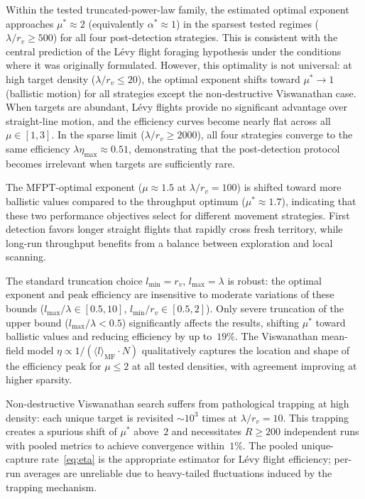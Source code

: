Within the tested truncated-power-law family, the estimated optimal exponent approaches $\mu^* \approx 2$ (equivalently $\alpha^* \approx 1$) in the sparsest tested regimes ($\lambda/r_v \geq 500$) for all four post-detection strategies. This is consistent with the central prediction of the L\'evy flight foraging hypothesis under the conditions where it was originally formulated. However, this optimality is not universal: at high target density ($\lambda/r_v \leq 20$), the optimal exponent shifts toward $\mu^* \to 1$ (ballistic motion) for all strategies except the non-destructive Viswanathan case. When targets are abundant, L\'evy flights provide no significant advantage over straight-line motion, and the efficiency curves become nearly flat across all $\mu \in [1,3]$. In the sparse limit ($\lambda/r_v \geq 2000$), all four strategies converge to the same efficiency $\lambda\eta_{\max} \approx 0.51$, demonstrating that the post-detection protocol becomes irrelevant when targets are sufficiently rare.

The MFPT-optimal exponent ($\mu \approx 1.5$ at $\lambda/r_v = 100$) is shifted toward more ballistic values compared to the throughput optimum ($\mu^* \approx 1.7$), indicating that these two performance objectives select for different movement strategies. First detection favors longer straight flights that rapidly cross fresh territory, while long-run throughput benefits from a balance between exploration and local scanning.

The standard truncation choice $l_{\min} = r_v$, $l_{\max} = \lambda$ is robust: the optimal exponent and peak efficiency are insensitive to moderate variations of these bounds ($l_{\max}/\lambda \in [0.5, 10]$, $l_{\min}/r_v \in [0.5, 2]$). Only severe truncation of the upper bound ($l_{\max}/\lambda < 0.5$) significantly affects the results, shifting $\mu^*$ toward ballistic values and reducing efficiency by up to~$19\%$. The Viswanathan mean-field model $\eta \propto 1/(\langle l \rangle_{\mathrm{MF}} \cdot N)$ qualitatively captures the location and shape of the efficiency peak for $\mu \leq 2$ at all tested densities, with agreement improving at higher sparsity.

Non-destructive Viswanathan search suffers from pathological trapping at high density: each unique target is revisited ${\sim}10^3$ times at $\lambda/r_v = 10$. This trapping creates a spurious shift of $\mu^*$ above~$2$ and necessitates $R \geq 200$ independent runs with pooled metrics to achieve convergence within~$1\%$. The pooled unique-capture rate~\eqref{eq:eta} is the appropriate estimator for L\'evy flight efficiency; per-run averages are unreliable due to heavy-tailed fluctuations induced by the trapping mechanism.

